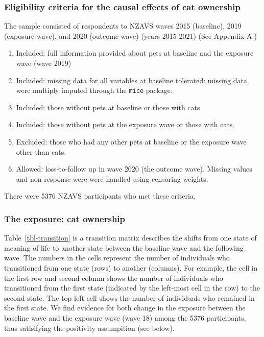\documentclass[
  singlecolumn,
  9pt]{article}
\providecommand{\tightlist}{%
  \setlength{\itemsep}{0pt}\setlength{\parskip}{0pt}}\usepackage{longtable,booktabs,array}
\begin{document}
\subsubsection{Eligibility criteria for the causal effects of cat
ownership}\label{eligibility-criteria-for-the-causal-effects-of-cat-ownership}

The sample consisted of respondents to NZAVS waves 2015 (baseline), 2019
(exposure wave), and 2020 (outcome wave) (years 2015-2021) (See Appendix
A.)

\begin{enumerate}
\def\labelenumi{\arabic{enumi}.}
\tightlist
\item
  Included: full information provided about pets at baseline and the
  exposure wave (wave 2019)
\item
  Included: missing data for all variables at baseline tolerated:
  missing data were multiply imputed through the \texttt{mice} package.
\item
  Included: those without pets at baseline or those with cats
\item
  Included: those without pets at the exposure wave or those with cats.
\item
  Excluded: those who had any other pets at baseline or the exposure
  wave other than cats.
\item
  Allowed: loss-to-follow up in wave 2020 (the outcome wave). Missing
  values and non-response were were handled using censoring weights.
\end{enumerate}

There were 5376 NZAVS participants who met these criteria.

\subsubsection{The exposure: cat
ownership}\label{the-exposure-cat-ownership}

Table~\ref{tbl-transition} is a transition matrix describes the shifts
from one state of meaning of life to another state between the baseline
wave and the following wave. The numbers in the cells represent the
number of individuals who transitioned from one state (rows) to another
(columns). For example, the cell in the first row and second column
shows the number of individuals who transitioned from the first state
(indicated by the left-most cell in the row) to the second state. The
top left cell shows the number of individuals who remained in the first
state. We find evidence for both change in the exposure between the
baseline wave and the exposure wave (wave 18) among the 5376
participants, thus satisifying the positivity assumpition (see below).
\end{document}
